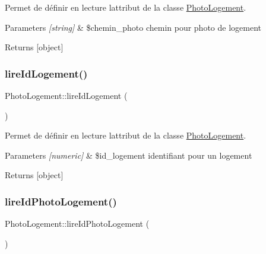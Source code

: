 Permet de définir en lecture l\textquotesingle{}attribut de la classe \hyperlink{class_photo_logement}{Photo\+Logement}. 


\begin{DoxyParams}{Parameters}
{\em \mbox{[}string\mbox{]}} & \$chemin\+\_\+photo chemin pour photo de logement \\
\hline
\end{DoxyParams}
\begin{DoxyReturn}{Returns}
\mbox{[}object\mbox{]} 
\end{DoxyReturn}
\mbox{\label{class_photo_logement_a81e1b7121f9bfb353fd6c80238d3d25a}} 
\subsubsection{\texorpdfstring{lire\+Id\+Logement()}{lireIdLogement()}}
{\footnotesize\ttfamily Photo\+Logement\+::lire\+Id\+Logement (\begin{DoxyParamCaption}{ }\end{DoxyParamCaption})}



Permet de définir en lecture l\textquotesingle{}attribut de la classe \hyperlink{class_photo_logement}{Photo\+Logement}. 


\begin{DoxyParams}{Parameters}
{\em \mbox{[}numeric\mbox{]}} & \$id\+\_\+logement identifiant pour un logement \\
\hline
\end{DoxyParams}
\begin{DoxyReturn}{Returns}
\mbox{[}object\mbox{]} 
\end{DoxyReturn}
\mbox{\label{class_photo_logement_a8e7af1076fe6deeae2e801e6e8219233}} 
\subsubsection{\texorpdfstring{lire\+Id\+Photo\+Logement()}{lireIdPhotoLogement()}}
{\footnotesize\ttfamily Photo\+Logement\+::lire\+Id\+Photo\+Logement (\begin{DoxyParamCaption}{ }\end{DoxyParamCaption})}



